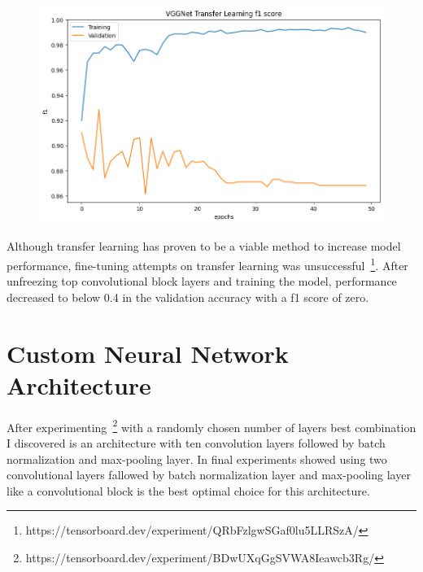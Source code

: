 \begin{figure}[H]
    \centering
    \includegraphics[width=.8\textwidth]{img/vggnettff1.png}
    \caption{}
    \label{fig:vggtff1}
\end{figure}

Although transfer learning has proven to be a viable method to increase model performance, fine-tuning attempts on transfer learning was unsuccessful~\footnote{https://tensorboard.dev/experiment/QRbFzlgwSGaf0lu5LLRSzA/}.
After unfreezing top convolutional block layers and training the model, performance decreased to below 0.4 in the validation accuracy with a f1 score of zero.

\section{Custom Neural Network Architecture}
After experimenting~\footnote{https://tensorboard.dev/experiment/BDwUXqGgSVWA8Ieawcb3Rg/} with a randomly chosen number of layers best combination I discovered is an architecture with ten convolution layers followed by batch normalization and max-pooling layer. 
In final experiments showed using two convolutional layers fallowed by batch normalization layer and max-pooling layer like a convolutional block is the best optimal choice for this architecture.

